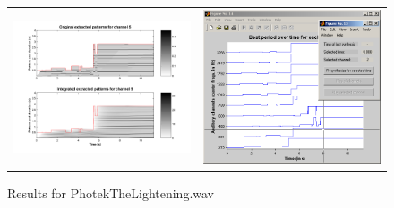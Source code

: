 \begin{figure}[p]
\begin{tabular}{cc}
        \includegraphics[width=7.5cm]{Graphics/MECDemoPhotekTheLighteningIntegrPattCh5} & \includegraphics[width=7.5cm]{Graphics/MECDemoPhotekTheLighteningUI}\\
    \end{tabular}
    \caption{Results for PhotekTheLightening.wav}
    \label{Fig:MECPhotekExample}
\end{figure}
